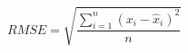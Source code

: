 \begin{equation}
RMSE = \sqrt{\frac{\sum _{i=1}^{n} (x_{i}-\widehat{x}_{i})^{2}}{n}}
\label{eq:rootMeanSquareError}
\end{equation}